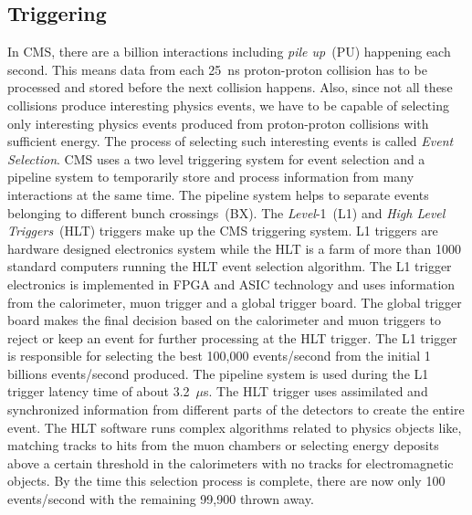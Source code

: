 \subsection{Triggering}
In CMS, there are a billion interactions including \textit{pile up}~(PU) happening each second. This means data from each 25~ns proton-proton collision has to be processed and stored before the next collision happens. Also, since not all these collisions produce 
interesting physics events, we have to be capable of selecting only interesting physics events produced from proton-proton collisions with sufficient  energy. The process of selecting such interesting events is called \textit{Event Selection}.
CMS uses a two level triggering system for event selection and a pipeline system to temporarily store and process information from many interactions at the same time. The pipeline system helps to separate events belonging to different bunch crossings~(BX).
The \textit{Level}-1~(L1) and \textit{High Level Triggers}~(HLT) triggers make up the CMS triggering system.
L1 triggers are hardware designed electronics system while the HLT is a farm of more than 1000 standard computers running the HLT event selection algorithm. %
\newline
The L1 trigger electronics is implemented in FPGA and ASIC technology and uses information from the calorimeter, muon trigger and a global trigger board. The global trigger board makes the final decision based on the calorimeter and muon triggers to reject or keep an event for further processing at the HLT trigger. The L1 trigger is responsible for selecting the best 100,000 events/second from the initial 1 billions events/second produced. The pipeline system is used during the L1 trigger latency time of about 3.2~$\mu$s.
\newline
The HLT trigger uses assimilated and synchronized information from different parts of the detectors to create the entire event. 
The HLT software runs complex algorithms related to physics objects like, matching tracks to hits from the muon chambers or selecting energy deposits above a certain threshold in the calorimeters with no tracks for electromagnetic objects. 
By the time this selection process is complete, there are now only 100 events/second with the remaining 99,900 thrown away.

